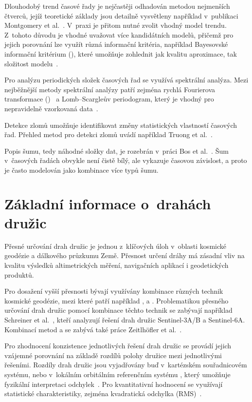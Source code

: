 Dlouhodobý trend časové řady je nejčastěji odhadován metodou nejmenších čtverců, jejíž teoretické základy jsou detailně vysvětleny například v~publikaci \mbox{Montgomery} et al.~\cite{montgomery_regression}. V~praxi je přitom nutné zvolit vhodný model trendu. Z~tohoto důvodu je vhodné uvažovat více kandidátních modelů, přičemž pro jejich porovnání lze využít různá informační kritéria, například Bayesovské informační kritérium (), které umožňuje zohlednit jak kvalitu aproximace, tak složitost modelu~\cite{kass_raftery_1995}.

Pro analýzu periodických složek časových řad se využívá spektrální analýza. Mezi nejběžnější metody spektrální analýzy patří zejména rychlá Fourierova trans\-formace ()~\cite{cooley_tukey_1965} a Lomb--Scargleův periodogram, který je vhodný pro nepravidelně vzorkovaná data~\cite{lomb_scargle}.

Detekce zlomů umožňuje identifikovat změny statistických vlastností časových řad. Přehled metod pro detekci zlomů uvádí například Truong et al.~\cite{change_point_review}.

Popis šumu, tedy náhodné složky dat, je rozebrán v~práci Bos et al.~\cite{bos_2019_time_series}. Šum v~časových řadách obvykle není čistě bílý, ale vykazuje časovou závislost, a proto je často modelován jako kombinace více typů šumu.

\section{Základní informace o~drahách družic}

Přesné určování drah družic je jednou z~klíčových úloh v~oblasti kosmické geodézie a dálkového průzkumu Země. Přesnost určení dráhy má zásadní vliv na kvalitu výsledků altimetrických měření, navigačních aplikací i geodetických produktů.

Pro dosažení vyšší přesnosti bývají využívány kombinace různých technik kosmické geodézie, mezi které patří například ,  a . Problematikou přesného určování drah družic pomocí kombinace těchto technik se zabývají například Schreiner et al.~\cite{schreiner_2023_pod_doris_gps_slr}, kteří analyzují řešení drah družic Sentinel-3A/B a Sentinel-6A. Kombinací metod  a  se zabývá také práce Zeitlhöfler et al.~\cite{zeitlhoefler_2025_combined_orbit_slr_doris}.

Pro zhodnocení konzistence jednotlivých řešení drah družic se provádí jejich vzájemné porovnání na základě rozdílů polohy družice mezi jednotlivými řešeními. Rozdíly drah družic jsou vyjadřovány buď v~kartézském souřadnicovém systému, nebo v~lokálním orbitálním referenčním systému , který umožňuje fyzikální interpretaci odchylek~\cite{schreiner_2023_pod_doris_gps_slr}. Pro kvantitativní hodnocení se využívají statistické charakteristiky, zejména kvadratická odchylka (RMS)~\cite{stepanek_2023_gop_itrf2020}.

